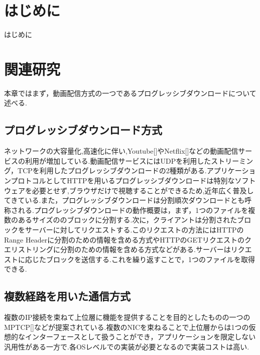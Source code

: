 \documentclass[a4j,12pt]{gradthesis_utf8}
\begin{document}
 
\maketitle %

\chapter{はじめに}\label{sec:sec1}
はじめに
\chapter{関連研究}\label{sec:sec2}
本章ではまず，動画配信方式の一つであるプログレッシブダウンロードについて述べる.

\section{プログレッシブダウンロード方式}
ネットワークの大容量化,高速化に伴い,Youtube[]やNetflix[]などの動画配信サービスの利用が増加している.動画配信サービスにはUDPを利用したストリーミング，TCPを利用したプログレッシブダウンロードの2種類がある.アプリケーションプロトコルとしてHTTPを用いるプログレッシブダウンロードは特別なソフトウェアを必要とせず,ブラウザだけで視聴することができるため,近年広く普及してきている.また，プログレッシブダウンロードは分割順次ダウンロードとも呼称される.プログレッシブダウンロードの動作概要は，まず，1つのファイルを複数のあるサイズののブロックに分割する.次に，クライアントは分割されたブロックをサーバーに対してリクエストする.このリクエストの方法にはHTTPのRange Headerに分割のための情報を含める方式やHTTPのGETリクエストのクエリストリングに分割のための情報を含める方式などがある.サーバーはリクエストに応じたブロックを送信する.これを繰り返すことで，1つのファイルを取得できる.

 \section{複数経路を用いた通信方式}
 複数のIP接続を束ねて上位層に機能を提供することを目的としたものの一つのMPTCP[]などが提案されている.複数のNICを束ねることで上位層からは1つの仮想的なインターフェースとして扱うことができ，アプリケーションを限定しない汎用性がある一方で.各OSレベルでの実装が必要となるので実装コストは高い.
 
\end{document}
